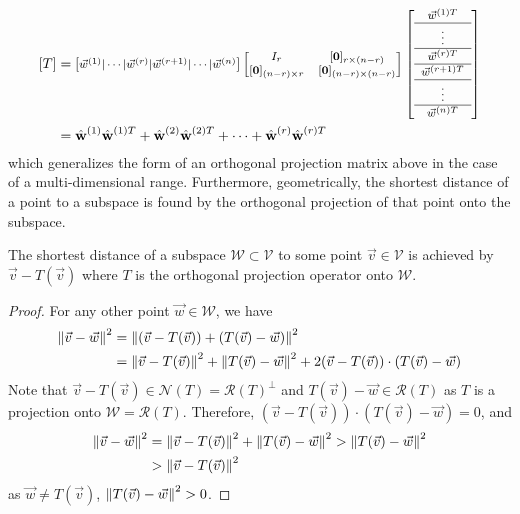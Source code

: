 \begin{subequations}
\begin{align}
[T] &= 
\footnotesize
\begin{bmatrix}
\vec{w}^{(1)}|\cdots|\vec{w}^{(r)}|\vec{w}^{(r+1)}|\cdots|\vec{w}^{(n)}
\end{bmatrix}
\begin{bmatrix}
I_r & [\textbf{0}]_{r\times(n-r)} \\
[\textbf{0}]_{(n-r)\times r} & [\textbf{0}]_{(n-r)\times(n-r)} \\
\end{bmatrix}
\left[\begin{array}{c} 
\vec{w}^{(1)T} \\
\hline
\vdots \\
\hline
\vec{w}^{(r)T} \Tstrut \\
\hline
\vec{w}^{(r+1)T} \Tstrut\\
\hline 
\vdots \\
\hline
\vec{w}^{(n)T} \Tstrut
\end{array}\right] \\
&= \hat{\textbf{w}}^{(1)}\hat{\textbf{w}}^{(1)T} + \hat{\textbf{w}}^{(2)}\hat{\textbf{w}}^{(2)T} + \cdots + \hat{\textbf{w}}^{(r)}\hat{\textbf{w}}^{(r)T} \label{eqn:projrank1sum}
\end{align}
\end{subequations}
which generalizes the form of an orthogonal projection matrix above in the case of a multi-dimensional range. Furthermore, geometrically, the shortest distance of a point to a subspace is found by the orthogonal projection of that point onto the subspace.
\begin{proper}
\label{proper:shortestorthoproj}
The shortest distance of a subspace $\mathcal{W} \subset \mathcal{V}$ to some point $\vec{v} \in \mathcal{V}$ is achieved by $\vec{v} - T(\vec{v})$ where $T$ is the orthogonal projection operator onto $\mathcal{W}$.
\end{proper}
\begin{proof}
For any other point $\vec{w} \in \mathcal{W}$, we have
\begin{align*}
\norm{\vec{v} - \vec{w}}^2 &= \norm{(\vec{v} - T(\vec{v})) + (T(\vec{v}) - \vec{w})}^2 \\
&= \norm{\vec{v} - T(\vec{v})}^2 + \norm{T(\vec{v}) - \vec{w}}^2 + 2 (\vec{v} - T(\vec{v})) \cdot (T(\vec{v}) - \vec{w})
\end{align*}
Note that $\vec{v} - T(\vec{v}) \in \mathcal{N}(T) = \mathcal{R}(T)^\perp$ and $T(\vec{v}) - \vec{w} \in \mathcal{R}(T)$ as $T$ is a projection onto $\mathcal{W} = \mathcal{R}(T)$. Therefore, $(\vec{v} - T(\vec{v})) \cdot (T(\vec{v}) - \vec{w}) = 0$, and 
\begin{subequations}
\begin{align}
\norm{\vec{v} - \vec{w}}^2 &= \norm{\vec{v} - T(\vec{v})}^2 + \norm{T(\vec{v}) - \vec{w}}^2 > \norm{T(\vec{v}) - \vec{w}}^2 \label{eqn:shortestsubspacealta} \\
& > \norm{\vec{v} - T(\vec{v})}^2 \label{eqn:shortestsubspacealtb}
\end{align}
\end{subequations}
as $\vec{w} \neq T(\vec{v})$, $\norm{T(\vec{v}) - \vec{w}}^2 > 0$.
\end{proof}
